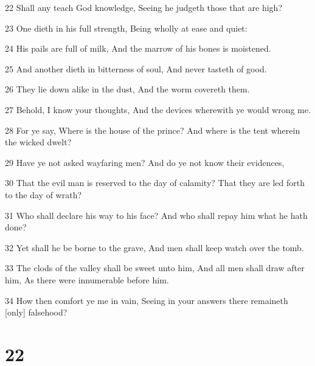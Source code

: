 \par 22 Shall any teach God knowledge, Seeing he judgeth those that are high?
\par 23 One dieth in his full strength, Being wholly at ease and quiet:
\par 24 His pails are full of milk, And the marrow of his bones is moistened.
\par 25 And another dieth in bitterness of soul, And never tasteth of good.
\par 26 They lie down alike in the dust, And the worm covereth them.
\par 27 Behold, I know your thoughts, And the devices wherewith ye would wrong me.
\par 28 For ye say, Where is the house of the prince? And where is the tent wherein the wicked dwelt?
\par 29 Have ye not asked wayfaring men? And do ye not know their evidences,
\par 30 That the evil man is reserved to the day of calamity? That they are led forth to the day of wrath?
\par 31 Who shall declare his way to his face? And who shall repay him what he hath done?
\par 32 Yet shall he be borne to the grave, And men shall keep watch over the tomb.
\par 33 The clods of the valley shall be sweet unto him, And all men shall draw after him, As there were innumerable before him.
\par 34 How then comfort ye me in vain, Seeing in your answers there remaineth [only] falsehood?

\chapter{22}

